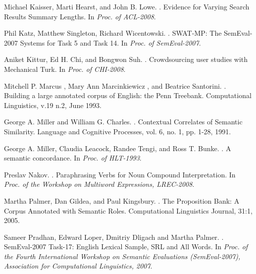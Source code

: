 \documentclass[11pt]{article}
\begin{document}
\begin{thebibliography}{}
Michael Kaisser, Marti Hearst, and John B. Lowe. 
.
\newblock Evidence for Varying Search Results Summary Lengths. 
\newblock In \textit{Proc. of ACL-2008}.

Phil Katz, Matthew Singleton, Richard Wicentowski. 
.
\newblock SWAT-MP: The SemEval-2007 Systems for Task 5 and Task 14.
\newblock In \textit{ Proc. of SemEval-2007}.

Aniket Kittur, Ed H. Chi, and Bongwon Suh. 
.
\newblock Crowdsourcing user studies with Mechanical Turk. 
\newblock In \textit{ Proc. of CHI-2008}.

Mitchell P. Marcus , Mary Ann Marcinkiewicz , and Beatrice Santorini.
.
\newblock Building a large annotated corpus of English: the Penn Treebank.
\newblock Computational Linguistics, v.19 n.2, June 1993.

George A. Miller and William G. Charles.
.
\newblock Contextual Correlates of Semantic Similarity.
\newblock Language and Cognitive Processes, vol. 6, no. 1, pp. 1-28, 1991.

George A. Miller, Claudia Leacock, Randee Tengi, and Ross T. Bunke.
.
\newblock A semantic concordance.
\newblock In \textit{Proc. of HLT-1993}.

Preslav Nakov.
.
\newblock Paraphrasing Verbs for Noun Compound Interpretation.
\newblock In \textit{Proc. of the Workshop on Multiword Expressions, LREC-2008}.


Martha Palmer, Dan Gildea, and Paul Kingsbury.
.
\newblock The Proposition Bank: A Corpus Annotated with Semantic Roles.
\newblock Computational Linguistics Journal, 31:1, 2005.

Sameer Pradhan, Edward Loper, Dmitriy Dligach and Martha Palmer. 
.
\newblock SemEval-2007 Task-17: English Lexical Sample, SRL and All Words. 
\newblock In \textit{ Proc. of the Fourth International Workshop on Semantic Evaluations (SemEval-2007), Association for Computational Linguistics, 2007}.


\end{thebibliography}
\end{document}
